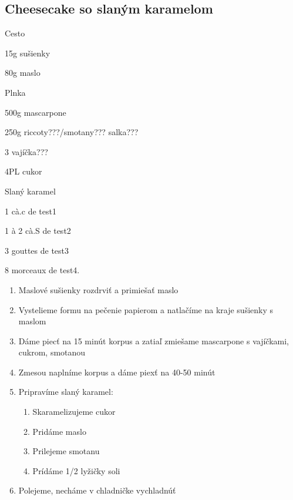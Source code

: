 \setcounter{step}{0}
\subsection{Cheesecake so slaným karamelom}

\begin{ingredient}
\def\portions{4}%

\begin{main}
	\item 
\end{main}
\begin{subingredient}{Cesto}
	\item 15g sušienky
	\item 80g maslo
\end{subingredient}
\begin{subingredient}{Plnka}
	\item 500g mascarpone
	\item 250g riccoty???/smotany??? salka???
	\item 3 vajíčka???
	\item 4PL cukor
\end{subingredient}
\begin{subingredient}{Slaný karamel}
	\item 1 cà.c de test1
	\item 1 à 2 cà.S de test2
	\item 3 gouttes de test3
	\item 8 morceaux de test4.	
\end{subingredient}

\end{ingredient}
\begin{recipe}

\begin{enumerate}

\item{Maslové sušienky rozdrviť a primiešať maslo}
\item{Vystelieme formu na pečenie papierom a natlačíme na kraje sušienky s maslom}
\item{Dáme piecť na 15 minút korpus a zatiaľ zmiešame mascarpone s vajíčkami, cukrom, smotanou}	
\item{Zmesou naplníme korpus a dáme piexť na 40-50 minút}
\item{Pripravíme slaný karamel:}
\begin{enumerate}
\item{Skaramelizujeme cukor}
\item{Pridáme maslo}
\item{Prilejeme smotanu}
\item{Prídáme 1/2 lyžičky soli}
\end{enumerate}
\item{Polejeme, necháme v chladničke vychladnúť}

\end{enumerate}
\end{recipe}

\begin{notes}

\end{notes}
\clearpage	